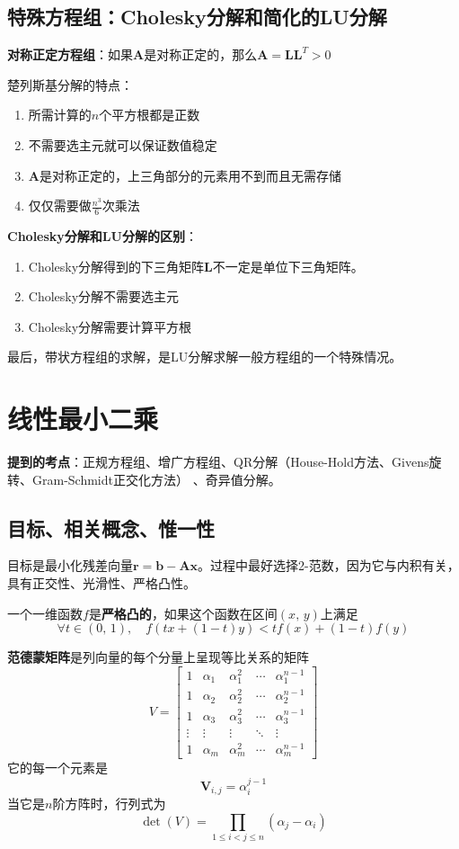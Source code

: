 \documentclass[14pt, letterpaper, UTF8, fontset=windowsnew, heading=true]{article}
\begin{document}
\subsection{特殊方程组：Cholesky分解和简化的LU分解}

\par
\textbf{对称正定方程组}：如果$\bm{A}$是对称正定的，那么$\bm{A}=\bm{LL}^T>0$
\par
楚列斯基分解的特点：
\begin{enumerate}
	\item
	所需计算的$n$个平方根都是正数
	\item
	不需要选主元就可以保证数值稳定
	\item
	$\bm{A}$是对称正定的，上三角部分的元素用不到而且无需存储
	\item
	仅仅需要做$\frac{n^3}{6}$次乘法
\end{enumerate}
\par
\textbf{Cholesky分解和LU分解的区别}：
\begin{enumerate}
	\item
	Cholesky分解得到的下三角矩阵$\bm{L}$不一定是单位下三角矩阵。
	\item
	Cholesky分解不需要选主元
	\item
	Cholesky分解需要计算平方根
\end{enumerate}

\par
最后，带状方程组的求解，是LU分解求解一般方程组的一个特殊情况。

\section{线性最小二乘}

\textbf{提到的考点}：正规方程组、增广方程组、QR分解（House-Hold方法、Givens旋转、Gram-Schmidt正交化方法）
、奇异值分解。

\subsection{目标、相关概念、惟一性}

\par
目标是最小化残差向量$\bm{r}=\bm{b}-\bm{Ax}$。过程中最好选择2-范数，因为它与内积有关，具有正交性、光滑性、严格凸性。
\par
一个一维函数$f$是\textbf{严格凸的}，如果这个函数在区间$(x,\,y)$上满足
$$\forall t\in (0,\,1),\quad f(tx+(1-t)y)<tf(x)+(1-t)f(y)$$
\par
\textbf{范德蒙矩阵}是列向量的每个分量上呈现等比关系的矩阵
$$V=\begin{bmatrix}1&\alpha_{1}&\alpha_{1}^{2}&\cdots &\alpha_{1}^{n-1}\\
1&\alpha_{2}&\alpha_{2}^{2}&\cdots &\alpha_{2}^{n-1}\\
1&\alpha_{3}&\alpha_{3}^{2}&\cdots &\alpha_{3}^{n-1}\\
\vdots &\vdots &\vdots &\ddots &\vdots \\
1&\alpha_{m}&\alpha_{m}^{2}&\cdots &\alpha_{m}^{n-1}
\end{bmatrix}$$
它的每一个元素是
$$\bm{V}_{i,j}=\alpha_i^{j-1}$$
当它是$n$阶方阵时，行列式为
$$\det(V)=\prod _{1\leq i<j\leq n}(\alpha _{j}-\alpha _{i})$$
\end{document}
